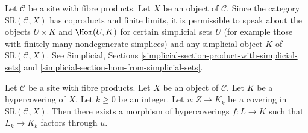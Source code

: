 \noindent
Let $\mathcal{C}$ be a site with fibre products.
Let $X$ be an object of $\mathcal{C}$.
Since the category $\text{SR}(\mathcal{C}, X)$ has coproducts and
finite limits, it is permissible to speak about the objects
$U \times K$ and $\Hom(U, K)$ for certain simplicial sets $U$
(for example those with finitely many nondegenerate simplices)
and any simplicial object $K$ of $\text{SR}(\mathcal{C}, X)$.
See Simplicial, Sections
\ref{simplicial-section-product-with-simplicial-sets} and
\ref{simplicial-section-hom-from-simplicial-sets}.

\begin{lemma}
\label{lemma-covering}
Let $\mathcal{C}$ be a site with fibre products.
Let $X$ be an object of $\mathcal{C}$.
Let $K$ be a hypercovering of $X$.
Let $k \geq 0$ be an integer.
Let $u : Z \to K_k$ be a covering
in $\text{SR}(\mathcal{C}, X)$.
Then there exists a morphism of hypercoverings
$f: L \to K$ such that $L_k \to K_k$
factors through $u$.
\end{lemma}

